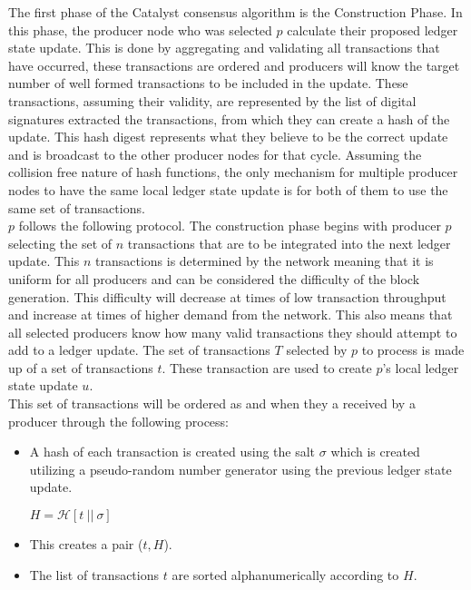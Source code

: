 The first phase of the Catalyst consensus algorithm is the Construction Phase. In this phase, the producer node who was selected $p$ calculate their proposed ledger state update. This is done by aggregating and validating all transactions that have occurred, these transactions are ordered and producers will know the target number of well formed transactions to be included in the update. These transactions, assuming their validity, are represented by the list of digital signatures extracted the transactions, from which they can create a hash of the update. This hash digest represents what they believe to be the correct update and is broadcast to the other producer nodes for that cycle. Assuming the collision free nature of hash functions, the only mechanism for multiple producer nodes to have the same local ledger state update is for both of them to use the same set of transactions. \\

$p$ follows the following protocol. The construction phase begins with producer $p$ selecting the set of $n$ transactions that are to be integrated into the next ledger update. This $n$ transactions is determined by the network meaning that it is uniform for all producers and can be considered the difficulty of the block generation. This difficulty will decrease at times of low transaction throughput and increase at times of higher demand from the network. This also means that all selected producers know how many valid transactions they should attempt to add to a ledger update. The set of transactions $T$ selected by $p$ to process is made up of a set of transactions $t$. These transaction are used to create $p$'s local ledger state update $u$. \\

This set of transactions will be ordered as and when they a received by a producer through the following process:

\begin{itemize} 
\item A hash of each transaction is created using the salt $\sigma$ which is created utilizing a pseudo-random number generator using the previous ledger state update.
\begin{center}
$H = \mathcal{H}[t~||~\sigma]$
\end{center}
\item This creates a pair ($t,H$).
\item The list of transactions $t$ are sorted alphanumerically according to $H$.
\end{itemize}

